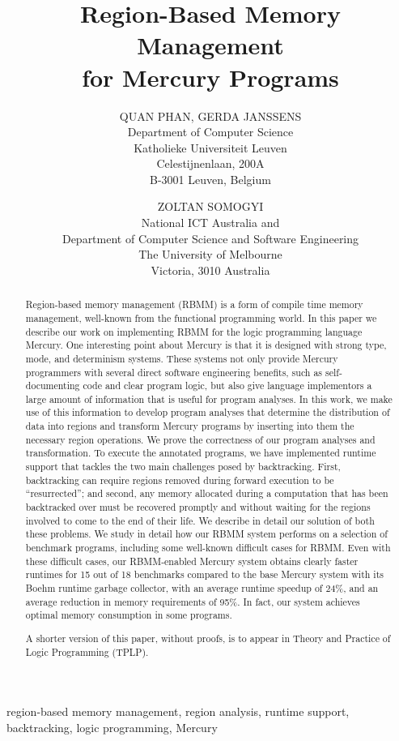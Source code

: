 \documentclass{tlp}
\title[Region-Based Memory Management for Mercury Programs]
    {Region-Based Memory Management\\for Mercury Programs}
\author[Q. Phan, G. Janssens and Z. Somogyi]
{QUAN PHAN, GERDA JANSSENS \\
Department of Computer Science \\
Katholieke Universiteit Leuven \\
Celestijnenlaan, 200A \\
B-3001 Leuven, Belgium \\
\email{quan.leuven@gmail.com,gerda.janssens@cs.kuleuven.be}
\and
ZOLTAN SOMOGYI \\
National ICT Australia and\\
Department of Computer Science and Software Engineering\\
The University of Melbourne\\
Victoria, 3010 Australia\\
\email{zs@unimelb.edu.au}
}
\begin{document}

\label{firstpage}
\maketitle

\begin{abstract}
Region-based memory management (RBMM)
is a form of compile time memory management,
well-known from the functional programming world.
In this paper we describe our work on implementing RBMM
for the logic programming language Mercury.
One interesting point about Mercury is that it is designed with
strong type, mode, and determinism systems.
These systems not only provide
Mercury programmers with several direct software engineering benefits,
such as self-documenting code and clear program logic,
but also give language implementors
a large amount of information that is useful for program analyses.
In this work, we make use of this information to develop program analyses
that determine the distribution of data into regions
and transform Mercury programs by inserting into them
the necessary region operations.
We prove the correctness of our program analyses and transformation.
To execute the annotated programs, we have implemented runtime support
that tackles the two main challenges posed by backtracking.
First, backtracking can require regions
removed during forward execution to be ``resurrected'';
and second,
any memory allocated during a computation that has been backtracked over
must be recovered promptly and without waiting
for the regions involved to come to the end of their life.
We describe in detail our solution of both these problems.
We study in detail how our RBMM system performs
on a selection of benchmark programs,
including some well-known difficult cases for RBMM.
Even with these difficult cases, our RBMM-enabled Mercury system
obtains clearly faster runtimes for 15 out of 18 benchmarks
compared to the base Mercury system with its Boehm runtime garbage collector,
with an average runtime speedup of 24\%,
and an average reduction in memory requirements of 95\%.
In fact, our system achieves optimal memory consumption in some programs.

A shorter version of this paper, without proofs,
is to appear in Theory and Practice of Logic Programming (TPLP).
\end{abstract}

\begin{keywords}
region-based memory management, region analysis, runtime support,
backtracking, logic programming, Mercury
\end{keywords}
\end{document}
